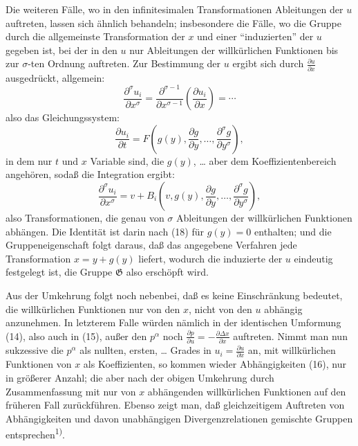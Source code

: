 \documentclass[12pt,a4paper]{article}
\begin{document}
Die weiteren F\"alle, wo in den infinitesimalen Transformationen Ableitungen der $u$ auftreten, lassen sich \"ahnlich behandeln; insbesondere die F\"alle, wo die Gruppe durch die allgemeinste Transformation der $x$ und einer ``induzierten'' der $u$ gegeben ist, bei der in den $u$ nur Ableitungen der willk\"urlichen Funktionen bis zur $\sigma$-ten Ordnung auftreten. Zur Bestimmung der $u$ ergibt sich durch $\tfrac{\partial u}{\partial x}$ ausgedr\"uckt, allgemein:
\[
\frac{\partial^{\sigma}u_{i}}{\partial x^{\sigma}}=\frac{\partial^{\sigma-1}}{\partial x^{\sigma-1}}\left(\frac{\partial u_{i}}{\partial x}\right)=\cdots
\]
also das Gleichungssystem:
\[
\frac{\partial u_{i}}{\partial t}=F\left(g(y),\frac{\partial g}{\partial y},\ldots,\frac{\partial^{\sigma}g}{\partial y^{\sigma}}\right),
\]
in dem nur $t$ und $x$ Variable sind, die $g(y)$, \ldots{} aber dem Koeffizientenbereich angeh\"oren, soda\ss{} die Integration ergibt:
\[
\frac{\partial^{\sigma}u_{i}}{\partial x^{\sigma}}=v+B_{i}\left(v,g(y),\frac{\partial g}{\partial y},\ldots,\frac{\partial^{\sigma}g}{\partial y^{\sigma}}\right),
\]
also Transformationen, die genau von $\sigma$ Ableitungen der willk\"urlichen Funktionen abh\"angen. Die Identit\"at ist darin nach (18) f\"ur $g(y)=0$ enthalten; und die Gruppeneigenschaft folgt daraus, da\ss{} das angegebene Verfahren jede Transformation $x=y+g(y)$ liefert, wodurch die induzierte der $u$ eindeutig festgelegt ist, die Gruppe $\mathfrak{G}$ also ersch\"opft wird.

Aus der Umkehrung folgt noch nebenbei, da\ss{} es keine Einschr\"ankung bedeutet, die willk\"urlichen Funktionen nur von den $x$, nicht von den $u$ abh\"angig anzunehmen. In letzterem Falle w\"urden n\"amlich in der identischen Umformung (14), also auch in (15), au\ss{}er den $p^{\alpha}$ noch $\tfrac{\partial p}{\partial u}=-\tfrac{\partial\Delta x}{\partial x}$ auftreten. Nimmt man nun sukzessive die $p^{\alpha}$ als nullten, ersten, \ldots{} Grades in $u_{i}=\tfrac{\partial u}{\partial x}$ an, mit willk\"urlichen Funktionen von $x$ als Koeffizienten, so kommen wieder Abh\"angigkeiten (16), nur in gr\"o\ss{}erer Anzahl; die aber nach der obigen Umkehrung durch Zusammenfassung mit nur von $x$ abh\"angenden willk\"urlichen Funktionen auf den fr\"uheren Fall zur\"uckf\"uhren. Ebenso zeigt man, da\ss{} gleichzeitigem Auftreten von Abh\"angigkeiten und davon unabh\"angigen Divergenzrelationen gemischte Gruppen entsprechen\textsuperscript{1)}.
\end{document}
